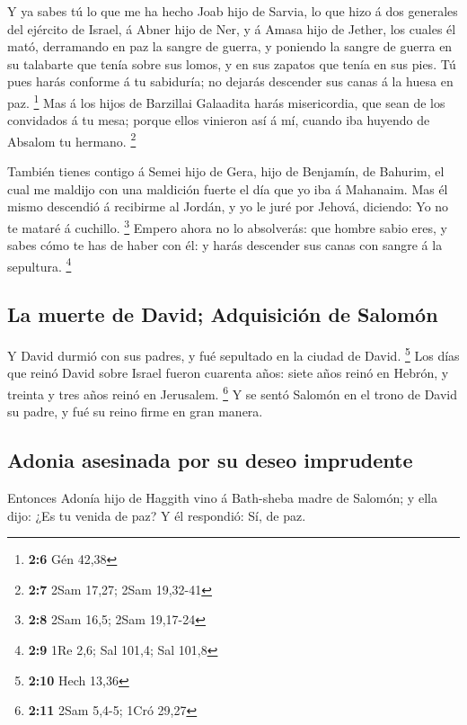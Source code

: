  Y ya sabes tú lo que me ha hecho Joab hijo de Sarvia, lo
que hizo á dos generales del ejército de Israel, á Abner hijo de Ner, y
á Amasa hijo de Jether, los cuales él mató, derramando en paz la sangre
de guerra, y poniendo la sangre de guerra en su talabarte que tenía
sobre sus lomos, y en sus zapatos que tenía en sus pies.  Tú
pues harás conforme á tu sabiduría; no dejarás descender sus canas á la
huesa en paz. \footnote{\textbf{2:6} Gén 42,38}  Mas á los
hijos de Barzillai Galaadita harás misericordia, que sean de los
convidados á tu mesa; porque ellos vinieron así á mí, cuando iba huyendo
de Absalom tu hermano. \footnote{\textbf{2:7} 2Sam 17,27; 2Sam 19,32-41}

 También tienes contigo á Semei hijo de Gera, hijo de
Benjamín, de Bahurim, el cual me maldijo con una maldición fuerte el día
que yo iba á Mahanaim. Mas él mismo descendió á recibirme al Jordán, y
yo le juré por Jehová, diciendo: Yo no te mataré á cuchillo. \footnote{\textbf{2:8}
  2Sam 16,5; 2Sam 19,17-24}  Empero ahora no lo absolverás:
que hombre sabio eres, y sabes cómo te has de haber con él: y harás
descender sus canas con sangre á la sepultura. \footnote{\textbf{2:9}
  1Re 2,6; Sal 101,4; Sal 101,8}

\hypertarget{la-muerte-de-david-adquisiciuxf3n-de-salomuxf3n}{%
\subsection{La muerte de David; Adquisición de
Salomón}\label{la-muerte-de-david-adquisiciuxf3n-de-salomuxf3n}}

 Y David durmió con sus padres, y fué sepultado en la
ciudad de David. \footnote{\textbf{2:10} Hech 13,36}  Los
días que reinó David sobre Israel fueron cuarenta años: siete años reinó
en Hebrón, y treinta y tres años reinó en Jerusalem. \footnote{\textbf{2:11}
  2Sam 5,4-5; 1Cró 29,27}  Y se sentó Salomón en el trono
de David su padre, y fué su reino firme en gran manera.

\hypertarget{adonia-asesinada-por-su-deseo-imprudente}{%
\subsection{Adonia asesinada por su deseo
imprudente}\label{adonia-asesinada-por-su-deseo-imprudente}}

 Entonces Adonía hijo de Haggith vino á Bath-sheba madre de
Salomón; y ella dijo: ¿Es tu venida de paz? Y él respondió: Sí, de paz.

